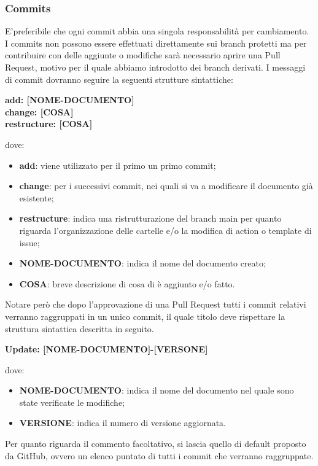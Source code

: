         \subsubsection{Commits}\label{inf:comm}
        E'preferibile che ogni commit abbia una singola responsabilità per cambiamento.
        I commits non possono essere effettuati direttamente sui branch protetti ma per contribuire con delle aggiunte o
        modifiche sarà necessario aprire una Pull Request, motivo per il quale abbiamo introdotto dei branch derivati.
        I messaggi di commit dovranno seguire la seguenti strutture sintattiche:
        \begin{center}
            \textbf{add: [NOME-DOCUMENTO]\\
            change: [COSA]\\
            restructure: [COSA]}
        \end{center}
        dove: 
        \begin{itemize}
            \item \textbf{add}: viene utilizzato per il primo un primo commit;
            \item \textbf{change}: per i successivi commit, nei quali si va a modificare il documento già esistente;
            \item \textbf{restructure}: indica una ristrutturazione del branch main per quanto riguarda l'organizzazione delle cartelle e/o la modifica di action o template di issue;
            \item \textbf{NOME-DOCUMENTO}: indica il nome del documento creato;
            \item \textbf{COSA}: breve descrizione di cosa di è aggiunto e/o fatto.
        \end{itemize}

        Notare però che dopo l'approvazione di una Pull Request tutti i commit
        relativi verranno raggruppati in un unico commit, il quale titolo deve rispettare la struttura sintattica descritta in
        seguito.
        \begin{center}
            \textbf{Update: [NOME-DOCUMENTO]-[VERSONE]}
        \end{center}
        dove:

        \begin{itemize}
            \item \textbf{NOME-DOCUMENTO}: indica il nome del documento nel quale sono state verificate le modifiche;
            \item \textbf{VERSIONE}: indica il numero di versione aggiornata.
        \end{itemize}
        Per quanto riguarda il commento facoltativo, si lascia quello di default proposto da GitHub, ovvero un elenco puntato di tutti i commit che verranno raggruppate.\\
        

